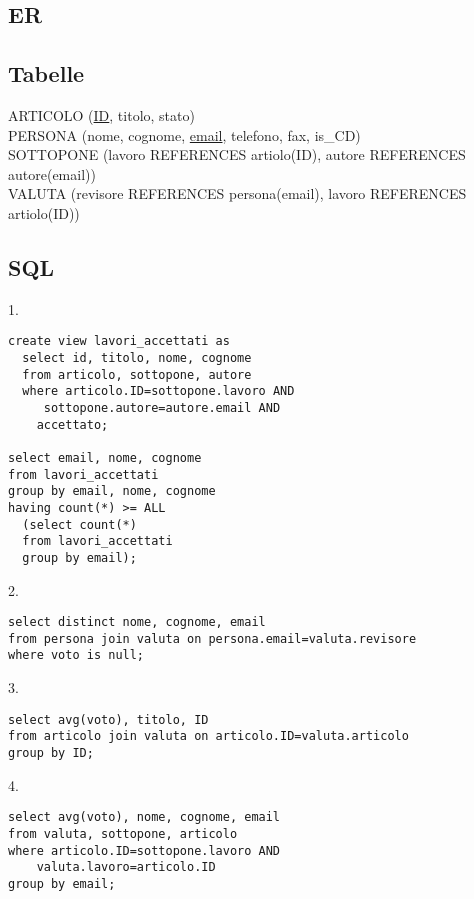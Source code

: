 \documentclass[11pt]{article}
\begin{document}
\subsection{ER}
\begin{center}
\end{center}

\subsection{Tabelle}

\noindent
ARTICOLO (\underline{ID}, titolo, stato)\\
PERSONA (nome, cognome, \underline{email}, telefono, fax, is\_CD)\\
SOTTOPONE (lavoro REFERENCES artiolo(ID), autore REFERENCES autore(email))\\
VALUTA (revisore REFERENCES persona(email), lavoro REFERENCES artiolo(ID))

\subsection{SQL}

1.
\begin{verbatim}
create view lavori_accettati as
  select id, titolo, nome, cognome
  from articolo, sottopone, autore
  where articolo.ID=sottopone.lavoro AND
     sottopone.autore=autore.email AND
    accettato;

select email, nome, cognome
from lavori_accettati
group by email, nome, cognome
having count(*) >= ALL
  (select count(*)
  from lavori_accettati
  group by email);
\end{verbatim}

2.
\begin{verbatim}
select distinct nome, cognome, email
from persona join valuta on persona.email=valuta.revisore
where voto is null;
\end{verbatim}

3.
\begin{verbatim}
select avg(voto), titolo, ID
from articolo join valuta on articolo.ID=valuta.articolo
group by ID;
\end{verbatim}

4.
\begin{verbatim}
select avg(voto), nome, cognome, email
from valuta, sottopone, articolo
where articolo.ID=sottopone.lavoro AND
    valuta.lavoro=articolo.ID
group by email;
\end{verbatim}
\end{document}
